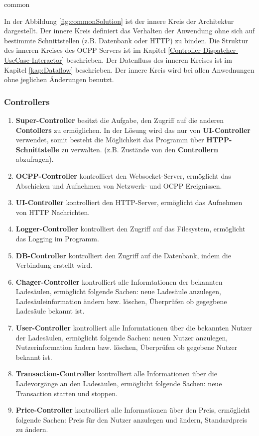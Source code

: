{common}

In der Abbildung \ref{fig:commonSolution} ist der innere Kreis der Architektur dargestellt. Der innere Kreis definiert das Verhalten der Anwendung 
ohne sich auf bestimmte Schnittstellen (z.B. Datenbank oder HTTP) zu binden. 
Die Struktur des inneren Kreises des OCPP Servers ist im Kapitel \ref{Controller-Dispatcher-UseCase-Interactor} beschrieben. 
Der Datenfluss des inneren Kreises ist im Kapitel \ref{kap:Dataflow} beschrieben.
Der innere Kreis wird bei allen Anwednungen ohne jeglichen Änderungen benutzt.

\newpage
\subsubsection{Controllers}

\begin{enumerate}
    \item \textbf{Super-Controller} besitzt die Aufgabe, den Zugriff auf die anderen \textbf{Contollers} zu ermöglichen. 
    In der Lösung wird das nur von \textbf{UI-Controller} verwendet, somit besteht die Möglichkeit das Programm über \textbf{HTPP-Schnittstelle} zu verwalten. 
    (z.B. Zustände von den \textbf{Controllern} abzufragen).
    \item \textbf{OCPP-Controller} kontrolliert den Websocket-Server, ermöglicht das Abschicken und Aufnehmen von Netzwerk- und OCPP Ereignissen.
    \item \textbf{UI-Controller} kontrolliert den HTTP-Server, ermöglicht das Aufnehmen von HTTP Nachrichten.
    \item \textbf{Logger-Controller} kontrolliert den Zugriff auf das Filesystem, ermöglicht das Logging im Programm.
    \item \textbf{DB-Controller} kontrolliert den Zugriff auf die Datenbank, indem die Verbindung erstellt wird.
    \item \textbf{Chager-Controller} kontrolliert alle Informtationen der bekannten Ladesäulen, 
    ermöglicht folgende Sachen: neue Ladesäule anzulegen, Ladesäuleinformation ändern bzw. löschen, Überprüfen ob gegegbene Ladesäule bekannt ist.
    \item \textbf{User-Controller} kontrolliert alle Informtationen über die bekannten Nutzer der Ladesäulen, ermöglicht folgende Sachen:
    neuen Nutzer anzulegen, Nutzerinformation ändern bzw. löschen, Überprüfen ob gegebene Nutzer bekannt ist.
    \item \textbf{Transaction-Controller} kontrolliert alle Informationen über die Ladevorgänge an den Ladesäulen, 
    ermöglicht folgende Sachen: neue Transaction starten und stoppen.
    \item \textbf{Price-Controller} kontrolliert alle Informationen über den Preis, ermöglicht folgende Sachen:
    Preis für den Nutzer anzulegen und ändern, Standardpreis zu ändern.
\end{enumerate}

